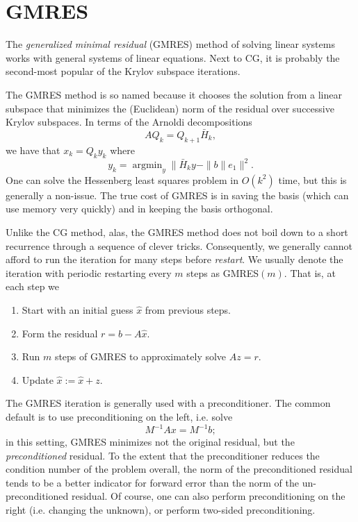 \section{GMRES}

The {\em generalized minimal residual} (GMRES) method of solving
linear systems works with general systems of linear equations.
Next to CG, it is probably the second-most popular of the Krylov
subspace iterations.

The GMRES method is so named because it chooses the solution from a
linear subspace that minimizes the (Euclidean) norm of the residual
over successive Krylov subspaces.  In terms of the Arnoldi
decompositions
\[
  AQ_k = Q_{k+1} \bar{H}_k,
\]
we have that $x_k = Q_k y_k$ where
\[
  y_k = \operatorname{argmin}_y \|\bar{H}_k y - \|b\| e_1\|^2.
\]
One can solve the Hessenberg least squares problem in $O(k^2)$
time, but this is generally a non-issue.  The true cost of GMRES
is in saving the basis (which can use memory very quickly) and in
keeping the basis orthogonal.

Unlike the CG method, alas, the GMRES method does not boil down to a
short recurrence through a sequence of clever tricks.  Consequently,
we generally cannot afford to run the iteration for many steps before
{\em restart}.  We usually denote the iteration with periodic
restarting every $m$ steps as GMRES$(m)$.  That is, at each step we
\begin{enumerate}
  \item Start with an initial guess $\hat{x}$ from previous steps.
  \item Form the residual $r = b-A\hat{x}$.
  \item Run $m$ steps of GMRES to approximately solve $Az = r$.
  \item Update $\hat{x} := \hat{x} + z$.
\end{enumerate}

The GMRES iteration is generally used with a preconditioner.
The common default is to use preconditioning on the left, i.e.
solve
\[
  M^{-1} A x = M^{-1} b;
\]
in this setting, GMRES minimizes not the original residual,
but the {\em preconditioned} residual.  To the extent that the
preconditioner reduces the condition number of the problem overall,
the norm of the preconditioned residual tends to be a better indicator
for forward error than the norm of the un-preconditioned residual.
Of course, one can also perform preconditioning on the right (i.e. changing
the unknown), or perform two-sided preconditioning.

